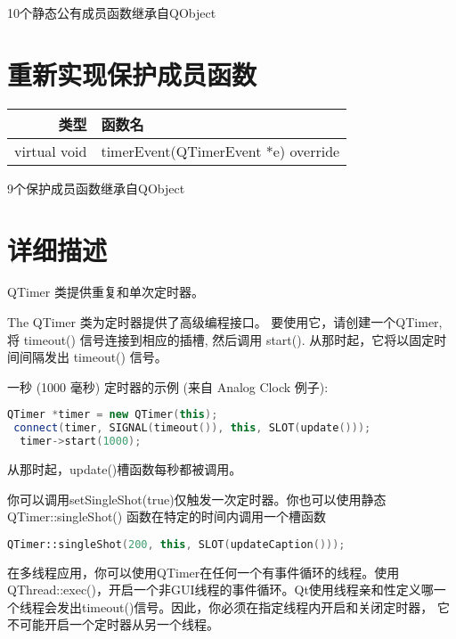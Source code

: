 \begin{compactitem}
\item 10个静态公有成员函数继承自QObject
\end{compactitem}

\section{重新实现保护成员函数}


\begin{tabular}{|r|l|}
	\hline
	类型	 & 函数名 \\
	\hline
virtual void	& timerEvent(QTimerEvent *e) override \\ 
\hline
\end{tabular}


\begin{compactitem}
\item 9个保护成员函数继承自QObject
\end{compactitem}

\section{详细描述}

QTimer 类提供重复和单次定时器。

The QTimer 类为定时器提供了高级编程接口。 要使用它，请创建一个QTimer, 将 timeout() 信号连接到相应的插槽, 然后调用 start(). 从那时起，它将以固定时间间隔发出 timeout() 信号。

一秒 (1000 毫秒) 定时器的示例 (来自 Analog Clock 例子):

\begin{lstlisting}[language=C++]
QTimer *timer = new QTimer(this);
 connect(timer, SIGNAL(timeout()), this, SLOT(update()));
  timer->start(1000);
\end{lstlisting}


从那时起，update()槽函数每秒都被调用。

你可以调用setSingleShot(true)仅触发一次定时器。你也可以使用静态QTimer::singleShot() 函数在特定的时间内调用一个槽函数

\begin{lstlisting}[language=C++]
QTimer::singleShot(200, this, SLOT(updateCaption()));
\end{lstlisting}

在多线程应用，你可以使用QTimer在任何一个有事件循环的线程。使用QThread::exec()，开启一个非GUI线程的事件循环。Qt使用线程亲和性定义哪一个线程会发出timeout()信号。因此，你必须在指定线程内开启和关闭定时器， 它不可能开启一个定时器从另一个线程。

